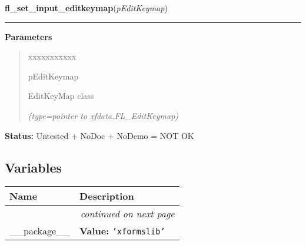 \hspace{.8\funcindent}\begin{boxedminipage}{\funcwidth}

    \raggedright \textbf{fl\_set\_input\_editkeymap}(\textit{pEditKeymap})

    \vspace{-1.5ex}

    \rule{\textwidth}{0.5\fboxrule}
\setlength{\parskip}{2ex}
\setlength{\parskip}{1ex}
      \textbf{Parameters}
      \vspace{-1ex}

      \begin{quote}
        \begin{Ventry}{xxxxxxxxxxx}

          \item[pEditKeymap]

          EditKeyMap class

            {\it (type=pointer to xfdata.FL\_EditKeymap)}

        \end{Ventry}

      \end{quote}

\textbf{Status:} Untested + NoDoc + NoDemo = NOT OK



    \end{boxedminipage}



  \subsection{Variables}

    \vspace{-1cm}
\hspace{\varindent}\begin{longtable}{|p{\varnamewidth}|p{\vardescrwidth}|l}
\cline{1-2}
\cline{1-2} \centering \textbf{Name} & \centering \textbf{Description}& \\
\cline{1-2}
\endhead\cline{1-2}\multicolumn{3}{r}{\small\textit{continued on next page}}\\\endfoot\cline{1-2}
\endlastfoot\raggedright \_\-\_\-p\-a\-c\-k\-a\-g\-e\-\_\-\_\- & \raggedright \textbf{Value:} 
{\tt \texttt{'}\texttt{xformslib}\texttt{'}}&\\
\cline{1-2}
\end{longtable}

